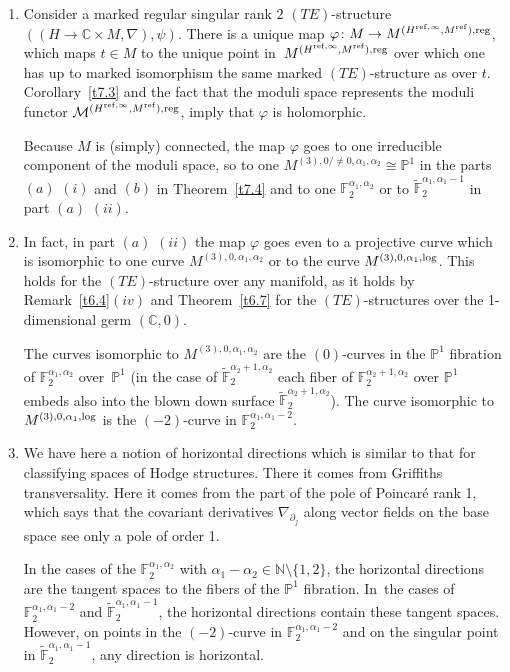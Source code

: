 \documentclass[pdftex]{sigma}%
\numberwithin{equation}{section}
\numberwithin{figure}{section}
\newcommand{\N}{{\mathbb N}}
\newcommand{\C}{{\mathbb C}}
\renewcommand{\P}{{\mathbb P}}
\newcommand{\F}{{\mathbb F}}
\newcommand{\MM}{{\mathcal M}}
\newcommand{\www}{\widetilde}
\newcommand{\paa}{\partial}
\newcommand{\nnn}{\nabla}
\begin{document}
\begin{Remarks}\label{t7.5}\quad

\begin{enumerate}\itemsep=-1pt
\item[$(i)$] Consider a marked regular singular rank $2$ $(TE)$-structure
$((H\to\C\times M,\nnn),\psi)$. There is a unique
map $\varphi\colon M\to M^{(H^{{\rm ref},\infty},M^{\rm ref}),{\rm reg}}$,
which maps $t\in M$ to the unique point in~$M^{(H^{{\rm ref},\infty},M^{\rm ref}),{\rm reg}}$ over which one has up to
marked isomorphism the same marked $(TE)$-structure
as over $t$. Corollary~\ref{t7.3} and the fact that the
moduli space represents the moduli functor
$\MM^{(H^{{\rm ref},\infty},M^{\rm ref}),{\rm reg}}$, imply that
$\varphi$ is holomorphic.

Because $M$ is (simply) connected, the map $\varphi$ goes to
one irreducible component of the moduli space,
so to one $M^{(3),0/\neq 0,\alpha_1,\alpha_2}\cong\P^1$
in the parts $(a)$ $(i)$ and $(b)$ in Theorem~\ref{t7.4}
and to one $\F_2^{\alpha_1,\alpha_2}$ or to
$\www\F_2^{\alpha_1,\alpha_1-1}$ in part $(a)$ $(ii)$.

\item[$(ii)$] In fact, in part $(a)$ $(ii)$ the map $\varphi$ goes even
to a projective curve which is isomorphic to one curve
$M^{(3),0,\alpha_1,\alpha_2}$ or to the curve
$M^{(3),0,\alpha_1,{\rm log}}$.
This holds for the $(TE)$-structure over any manifold,
as it holds by Remark~\ref{t6.4}$(iv)$ and Theorem~\ref{t6.7} for the $(TE)$-structures over the
1-dimensional germ $(\C,0)$.

The curves isomorphic to $M^{(3),0,\alpha_1,\alpha_2}$
are the $(0)$-curves in the $\P^1$ fibration of
$\F_2^{\alpha_1,\alpha_2}$ over~$\P^1$ \big(in the case of
$\www\F_2^{\alpha_2+1,\alpha_2}$ each fiber of
$\F_2^{\alpha_2+1,\alpha_2}$ over $\P^1$ embeds also into
the blown down surface $\www\F_2^{\alpha_2+1,\alpha_2}$\big).
The curve isomorphic to $M^{(3),0,\alpha_1,{\rm log}}$
is the $(-2)$-curve in $\F_2^{\alpha_1,\alpha_1-2}$.

\item[$(iii)$] We have here a notion of horizontal directions which
is similar to that for classifying spaces of
Hodge structures. There it comes from Griffiths
transversality. Here it comes from the part of the
pole of Poincar\'e rank 1, which says that the covariant
derivatives $\nnn_{\paa_j}$ along vector fields on the
base space see only a pole of order 1.

In the cases of the $\F_2^{\alpha_1,\alpha_2}$
with $\alpha_1-\alpha_2\in\N\setminus \{1,2\}$, the horizontal
directions are the tangent spaces to the fibers of the
$\P^1$ fibration. In~the cases of $\F_2^{\alpha_1,\alpha_1-2}$ and
$\www \F_2^{\alpha_1,\alpha_1-1}$, the horizontal directions
contain these tangent spaces.
However, on points in the $(-2)$-curve in
$\F_2^{\alpha_1,\alpha_1-2}$
and on the singular point in
$\www\F_2^{\alpha_1,\alpha_1-1}$,
any direction is horizontal.
\end{enumerate}
\end{Remarks}
\end{document}
